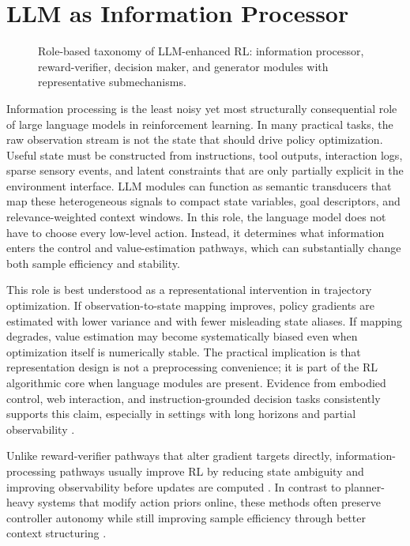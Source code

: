 \documentclass[pdflatex,sn-mathphys-num]{sn-jnl}
\begin{document}
\section{LLM as Information Processor}
\begin{figure}[t]
\centering

\caption{Role-based taxonomy of LLM-enhanced RL: information processor, reward-verifier, decision maker, and generator modules with representative submechanisms.}
\label{fig:taxonomy}
\end{figure}

Information processing is the least noisy yet most structurally consequential role of large language models in reinforcement learning. In many practical tasks, the raw observation stream is not the state that should drive policy optimization. Useful state must be constructed from instructions, tool outputs, interaction logs, sparse sensory events, and latent constraints that are only partially explicit in the environment interface. LLM modules can function as semantic transducers that map these heterogeneous signals to compact state variables, goal descriptors, and relevance-weighted context windows. In this role, the language model does not have to choose every low-level action. Instead, it determines what information enters the control and value-estimation pathways, which can substantially change both sample efficiency and stability.

This role is best understood as a representational intervention in trajectory optimization. If observation-to-state mapping improves, policy gradients are estimated with lower variance and with fewer misleading state aliases. If mapping degrades, value estimation may become systematically biased even when optimization itself is numerically stable. The practical implication is that representation design is not a preprocessing convenience; it is part of the RL algorithmic core when language modules are present. Evidence from embodied control, web interaction, and instruction-grounded decision tasks consistently supports this claim, especially in settings with long horizons and partial observability \cite{arxiv_p_2205_12258,arxiv_p_2302_06692,arxiv_p_2311_13373,arxiv_p_2411_02337,arxiv_p_2601_12762,arxiv_p_2602_13559}.

Unlike reward-verifier pathways that alter gradient targets directly, information-processing pathways usually improve RL by reducing state ambiguity and improving observability before updates are computed \cite{arxiv_p_2602_06493,arxiv_p_2602_12579,arxiv_p_2310_12931}. In contrast to planner-heavy systems that modify action priors online, these methods often preserve controller autonomy while still improving sample efficiency through better context structuring \cite{arxiv_p_2204_01691,arxiv_p_2305_16291,arxiv_p_2602_07848}.
\end{document}
